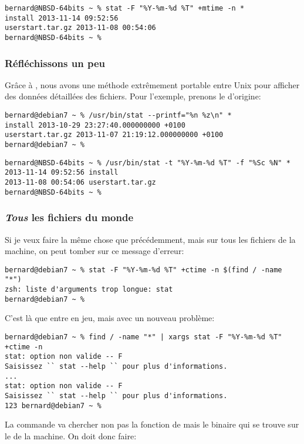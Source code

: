 \begin{lstlisting}
bernard@NBSD-64bits ~ % stat -F "%Y-%m-%d %T" +mtime -n *
install 2013-11-14 09:52:56
userstart.tar.gz 2013-11-08 00:54:06
bernard@NBSD-64bits ~ %
\end{lstlisting}

\subsubsection{Réfléchissons un peu}
Grâce à \zsh{}, nous avons une méthode extrêmement portable entre Unix pour afficher des données détaillées des fichiers. Pour l'exemple, prenons le  d'origine:

\begin{lstlisting}
bernard@debian7 ~ % /usr/bin/stat --printf="%n %z\n" *
install 2013-10-29 23:27:40.000000000 +0100
userstart.tar.gz 2013-11-07 21:19:12.000000000 +0100
bernard@debian7 ~ %
\end{lstlisting}

\begin{lstlisting}
bernard@NBSD-64bits ~ % /usr/bin/stat -t "%Y-%m-%d %T" -f "%Sc %N" *
2013-11-14 09:52:56 install
2013-11-08 00:54:06 userstart.tar.gz
bernard@NBSD-64bits ~ %
\end{lstlisting}

\subsubsection{\emph{Tous} les fichiers du monde}
Si je veux faire la même chose que précédemment, mais sur tous les fichiers de la machine, on peut tomber sur ce message d'erreur:

\begin{lstlisting}
bernard@debian7 ~ % stat -F "%Y-%m-%d %T" +ctime -n $(find / -name "*")
zsh: liste d'arguments trop longue: stat
bernard@debian7 ~ %
\end{lstlisting}

C'est là que  entre en jeu, mais avec un nouveau problème:

\begin{lstlisting}
bernard@debian7 ~ % find / -name "*" | xargs stat -F "%Y-%m-%d %T" +ctime -n
stat: option non valide -- F
Saisissez `` stat --help `` pour plus d'informations.
...
stat: option non valide -- F
Saisissez `` stat --help `` pour plus d'informations.
123 bernard@debian7 ~ %
\end{lstlisting}

La commande  va chercher non pas la fonction de \zsh{} mais le binaire qui se trouve sur le  de la machine. On doit donc faire:

